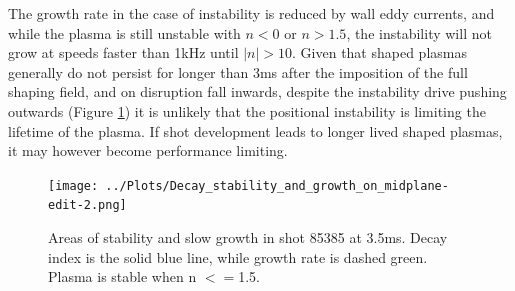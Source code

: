 \documentclass[aps,preprint,showpacs,superscriptaddress,groupedaddress]{revtex4}  %
\begin{document}
	\par The growth rate in the case of instability is reduced by wall eddy currents, and while the plasma is still unstable with $n < 0$ or $n > 1.5$, the instability will not grow at speeds faster than 1kHz until $|n| > 10$.  %
	Given that shaped plasmas generally do not persist for longer than 3ms after the imposition of the full shaping field, and on disruption fall inwards, despite the instability drive pushing outwards (Figure \ref{decay_index_and growth}) it is unlikely that the positional instability is limiting the lifetime of the plasma.  If shot development leads to longer lived shaped plasmas, it may however become performance limiting.
\begin{figure}[htb]
\centering
\texttt{[image: ../Plots/Decay\_stability\_and\_growth\_on\_midplane-edit-2.png]}
\caption{Areas of stability and slow growth in shot 85385 at 3.5ms. Decay index is the solid blue line, while growth rate is dashed green. Plasma is stable when n $<=$1.5.}
\label{decay_index_and growth}
\end{figure}
\end{document}
